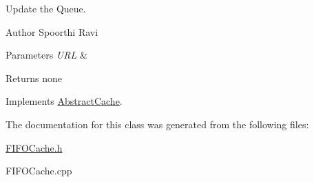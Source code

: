 \-Update the \-Queue. 

\begin{DoxyAuthor}{\-Author}
\-Spoorthi \-Ravi 
\end{DoxyAuthor}

\begin{DoxyParams}{\-Parameters}
{\em \-U\-R\-L} & \\
\hline
\end{DoxyParams}
\begin{DoxyReturn}{\-Returns}
none 
\end{DoxyReturn}


\-Implements \hyperlink{classAbstractCache}{\-Abstract\-Cache}.



\-The documentation for this class was generated from the following files\-:\begin{DoxyCompactItemize}
\item 
\hyperlink{FIFOCache_8h}{\-F\-I\-F\-O\-Cache.\-h}\item 
\-F\-I\-F\-O\-Cache.\-cpp\end{DoxyCompactItemize}
